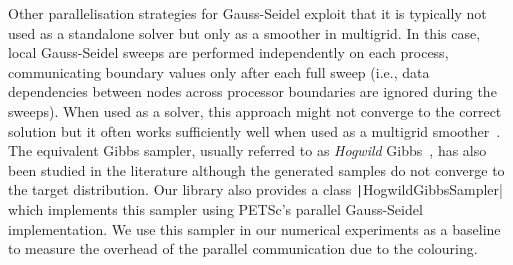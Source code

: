 \documentclass[
fontsize=11pt,
paper=a4,
numbers=noenddot
]{scrartcl}
\begin{document}
Other parallelisation strategies for Gauss-Seidel exploit that it is typically not used as a standalone solver but only as a smoother in multigrid. In this case, local Gauss-Seidel sweeps are performed independently on each process, communicating boundary values only after each full sweep (i.e., data dependencies between nodes across processor boundaries are ignored during the sweeps). When used as a solver, this approach might not converge to the correct solution but it often works sufficiently well when used as a multigrid smoother~\cite{parmultigrid}. The equivalent Gibbs sampler, usually referred to as \emph{Hogwild} Gibbs~\cite{hogwild}, has also been studied in the literature although the generated samples do not converge to the target distribution. Our library also provides a class \texttt|HogwildGibbsSampler| which implements this sampler using PETSc's parallel Gauss-Seidel implementation. We use this sampler in our numerical experiments as a baseline to measure the overhead of the parallel communication due to the colouring.


\end{document}
